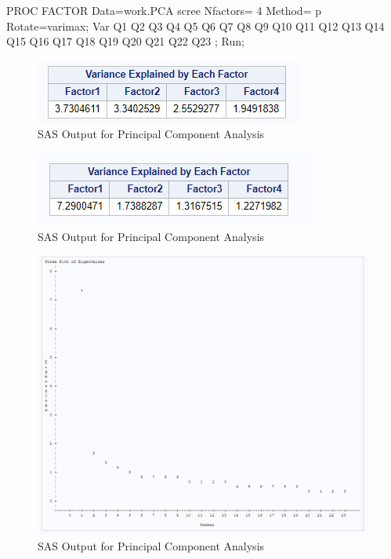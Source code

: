 \documentclass[
]{book}
\newenvironment{Shaded}{\begin{snugshade}}{\end{snugshade}}
\newcommand{\DecValTok}[1]{\textcolor[rgb]{0.00,0.00,0.81}{#1}}
\newcommand{\NormalTok}[1]{#1}
\newcommand{\StringTok}[1]{\textcolor[rgb]{0.31,0.60,0.02}{#1}}
\begin{document}
\begin{Shaded}
\begin{Highlighting}[]
\NormalTok{PROC FACTOR Data=work.PCA scree}
\NormalTok{		Nfactors=}\StringTok{ }\DecValTok{4}
\NormalTok{		Method=}\StringTok{ }\NormalTok{p}
\NormalTok{		Rotate=varimax;}
\NormalTok{		Var Q1 Q2 Q3 Q4 Q5 Q6 Q7 Q8 Q9 Q10 Q11 Q12 Q13 Q14 Q15 Q16 Q17 Q18 Q19 Q20 Q21 Q22 Q23}
\NormalTok{		; }
\NormalTok{		Run;}
\end{Highlighting}
\end{Shaded}

\begin{figure}[!h]
\includegraphics{Screenshots/Principal Component Analysis/pcaSAS1} \caption{\label{fig:pcaSAS}SAS Output for Principal Component Analysis}\label{fig:pcaSAS}
\end{figure}

\begin{figure}[!h]
\includegraphics{Screenshots/Principal Component Analysis/pcaSAS2} \caption{\label{fig:pcaSAS}SAS Output for Principal Component Analysis}\label{fig:pcaSAS2}
\end{figure}

\begin{figure}[!h]
\includegraphics{Screenshots/Principal Component Analysis/pcaSAS3} \caption{\label{fig:pcaSAS}SAS Output for Principal Component Analysis}\label{fig:pcaSAS3}
\end{figure}
\end{document}
